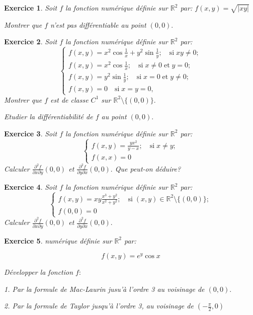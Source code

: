 \documentclass[11pt,a4paper]{report}
\newtheorem{exo}{Exercice}[section]
\begin{document}
\begin{exo}
Soit $f$ la fonction numérique définie sur $\mathbb{R}^2$ par:
$f(x,y)=\sqrt{|xy|}$

Montrer que $f$ n'est pas différentiable au point $(0,0).$
\end{exo}
\begin{exo}
Soit $f$ la fonction numérique définie sur $\mathbb{R}^2$ par:
$$\begin{cases}
f(x,y)=x^2\cos\frac{1}{x}+y^2\sin\frac{1}{y}; \quad\mbox{si}\;xy\neq0;\\
f(x,y)=x^2\cos\frac{1}{x} ; \quad\mbox{si}\;x\neq0\;\mbox{et}\;y=0;\\
f(x,y)=y^2\sin\frac{1}{y}; \quad\mbox{si}\;x=0\;\mbox{et}\;y\neq0;\\
f(x,y)=0 \quad\mbox{si}\;x=y=0,
\end{cases}$$
Montrer que $f$ est de classe $C^1$ sur $\mathbb{R}^2\setminus\{(0,0)\}.$

Etudier la différentiabilité de $f$ au point $(0,0).$
\end{exo}
\begin{exo}
Soit $f$ la fonction numérique définie sur $\mathbb{R}^2$ par:
$$\begin{cases}
f(x,y)=\frac{yx^2}{y-x}; \quad\mbox{si}\;x\neq y;\\
f(x,x)=0
\end{cases}$$
Calculer $\frac{\partial^2 f}{\partial x \partial y}(0,0)$ et $\frac{\partial^2 f}{\partial y \partial x}(0,0).$ Que peut-on déduire?
\end{exo}
\begin{exo}
Soit $f$ la fonction numérique définie sur $\mathbb{R}^2$ par:
$$\begin{cases}
f(x,y)=xy\frac{x^3+y^2}{x^2+y^2}; \quad\mbox{si}\;(x,y)\in\mathbb{R}^2\setminus\{(0,0)\};\\
f(0,0)=0
\end{cases}$$
Calculer $\frac{\partial^2 f}{\partial x \partial y}(0,0)$ et $\frac{\partial^2 f}{\partial y \partial x}(0,0).$
\end{exo}
\begin{exo}
numérique définie sur $\mathbb{R}^2$ par:

$$f(x,y)=e^y \cos x$$

Développer la fonction $f:$

1. Par la formule de Mac-Laurin jusu'à l'ordre 3 au voisinage de $(0,0).$

2. Par la formule de Taylor jusqu'à l'ordre 3, au voisinage de $(-\frac{\pi}{2},0)$
\end{exo}
\end{document}
